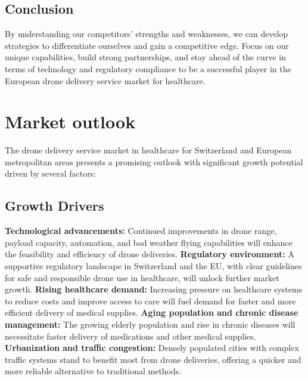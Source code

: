 \subsection{Conclusion}
By understanding our competitors' strengths and weaknesses, we can develop strategies to differentiate ourselves and gain a competitive edge. Focus on our unique capabilities, build strong partnerships, and stay ahead of the curve in terms of technology and regulatory compliance to be a successful player in the European drone delivery service market for healthcare.

\section{Market outlook}
The drone delivery service market in healthcare for Switzerland and European metropolitan areas presents a promising outlook with significant growth potential driven by several factors:
\subsection{Growth Drivers}
\textbf{Technological advancements:} Continued improvements in drone range, payload capacity, automation, and bad weather flying capabilities will enhance the feasibility and efficiency of drone deliveries. \cite{fortunebusinessinsights_2023_medical}
\newline
\textbf{Regulatory environment:} A supportive regulatory landscape in Switzerland and the EU, with clear guidelines for safe and responsible drone use in healthcare, will unlock further market growth. \cite{fortunebusinessinsights_2023_medical}
\newline
\textbf{Rising healthcare demand:} Increasing pressure on healthcare systems to reduce costs and improve access to care will fuel demand for faster and more efficient delivery of medical supplies. \cite{fortunebusinessinsights_2023_medical}
\newline
\textbf{Aging population and chronic disease management:} The growing elderly population and rise in chronic diseases will necessitate faster delivery of medications and other medical supplies. \cite{fortunebusinessinsights_2023_medical}
\newline
\textbf{Urbanization and traffic congestion:} Densely populated cities with complex traffic systems stand to benefit most from drone deliveries, offering a quicker and more reliable alternative to traditional methods. \cite{fortunebusinessinsights_2023_medical}
